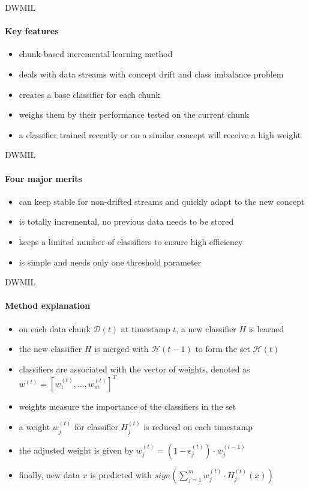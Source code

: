 
\begin{frame}{DWMIL}
\framesubtitle{Key features}

\begin{itemize}
    \item chunk-based incremental learning method
    \item deals with data streams with concept drift and class imbalance problem
    \item creates a base classifier for each chunk 
    \item weighs them by their performance tested on the current chunk
    \item a classifier trained recently or on a similar concept will receive a high weight
\end{itemize}

\end{frame}


\begin{frame}{DWMIL}
\framesubtitle{Four major merits}

\begin{itemize}
    \item can keep stable for non-drifted streams and quickly adapt to the new concept
    \item is totally incremental, no previous data needs to be stored
    \item keeps a limited number of classifiers to ensure high efficiency
    \item is simple and needs only one threshold parameter
\end{itemize}

\end{frame}


\begin{frame}{DWMIL}
\framesubtitle{Method explanation}

\begin{itemize}
    \item on each data chunk $\mathcal{D}(t)$ at timestamp $t$, a new classifier $H$ is learned
    \item the new classifier $H$ is merged with $\mathcal{H}(t-1)$ to form the set $\mathcal{H}(t)$
    \item classifiers are associated with the vector of weights, denoted as 
        $w^{(t)} = [w_1^{(t)}, ... ,w_m^{(t)}]^T$
    \item weights measure the importance of the classifiers in the set
    \item a weight $w_j^{(t)}$ for classifier $H_j^{(t)}$ is reduced on each timestamp
    \item the adjusted weight is given by 
        $w_j^{(t)} = (1 - \epsilon_j^{(t)}) \cdot w_j^{(t - 1)}$
    \item finally, new data $x$ is predicted with
        $sign(\sum_{j=1}^{m} w_j^{(t)} \cdot H_j^{(t)}(x))$
\end{itemize}

\end{frame}

